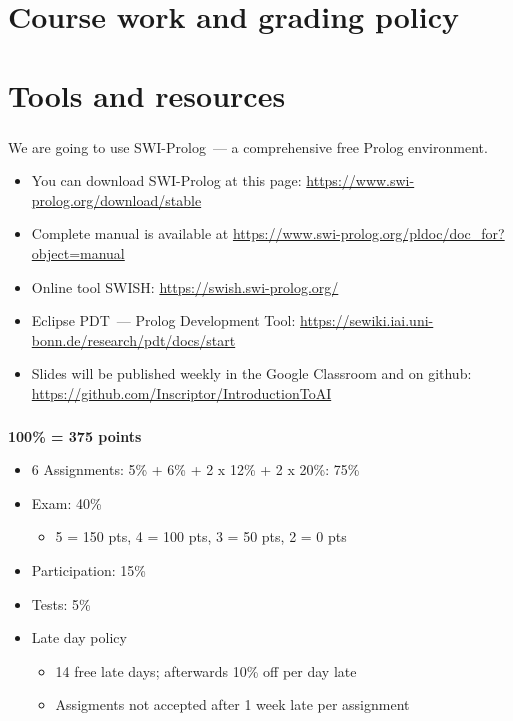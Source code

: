 \frame[plain]{\titlepage}


\section{Course work and grading policy}

\section{Tools and resources}

\begin{frame}
	\frametitle{\insertsection}
	We are going to use SWI-Prolog~--- a comprehensive free Prolog environment.
	\begin{itemize}
		\item You can download SWI-Prolog at this page: \href{https://www.swi-prolog.org/download/stable}{https://www.swi-prolog.org/download/stable}
		\item Complete manual is available at \href{https://www.swi-prolog.org/pldoc/doc_for?object=manual}{https://www.swi-prolog.org/pldoc/doc\_for?object=manual}
		\item Online tool SWISH: \href{https://swish.swi-prolog.org/}{https://swish.swi-prolog.org/}
		\item Eclipse PDT~--- Prolog Development Tool: \href{https://sewiki.iai.uni-bonn.de/research/pdt/docs/start}{https://sewiki.iai.uni-bonn.de/research/pdt/docs/start}
		\item Slides will be published weekly in the Google Classroom and on github: \href{https://github.com/Inscriptor/IntroductionToAI}{https://github.com/Inscriptor/IntroductionToAI}
	\end{itemize}
\end{frame}


\begin{frame}
	\frametitle{\insertsection}
	
	\textbf{100\% = 375 points}
	
	\begin{itemize}
		\item 6 Assignments: 5\% + 6\% + 2 x 12\% + 2 x 20\%: 75\%
		\item Exam: 40\%
		\begin{itemize}
			\item 5 = 150 pts, 4 = 100 pts, 3 = 50 pts, 2 = 0 pts
		\end{itemize}
		\item Participation: 15\%
		\item Tests: 5\%
		\item Late day policy
		\begin{itemize}
			\item 14 free late days; afterwards 10\% off per day late
			\item Assigments not accepted after 1 week late per assignment
		\end{itemize}
	\end{itemize}
	
\end{frame}


